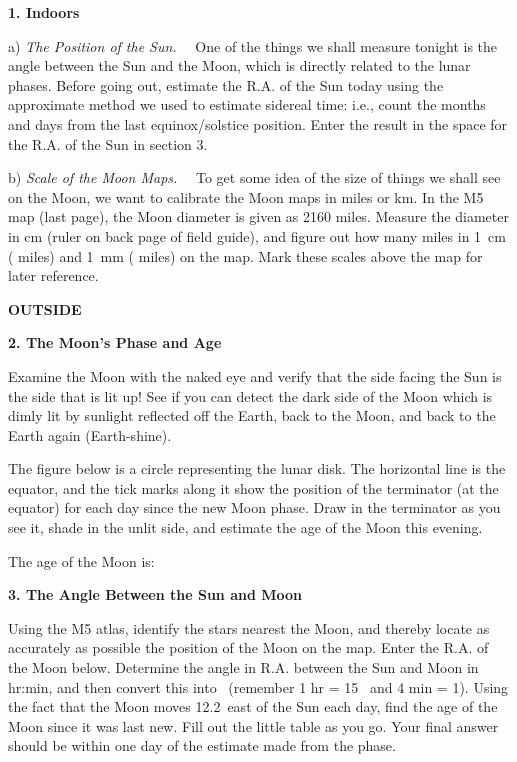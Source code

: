 
\bigskip
\noindent
{\bf 1. Indoors  }

\medskip\noindent 
a) \emph{The Position of the Sun.} \ \ 
One of the things we shall measure tonight is the angle between the Sun
and the Moon, which is directly related to the lunar phases. Before going
out, estimate the R.A. of the Sun today using the approximate
method we used to estimate sidereal time: i.e., count the months and
days from the last equinox/solstice position. Enter the result in the
space for the R.A. of the Sun in section 3.

\medskip\noindent 
b) \emph{Scale of the Moon Maps.} \ \
To get some idea of the size of things we shall see on the Moon, we want to
calibrate the Moon maps in miles or km. In the M5 map (last page), the
Moon diameter is given as 2160 miles. Measure the diameter in cm (ruler
on back page of field guide), and figure out how many miles in 1~cm
(\makebox[1.5cm]{\hrulefill} miles) and 1~mm (\makebox[1.5
cm]{\hrulefill} miles) on the map. Mark these scales above the map for
later reference. 

\bigskip
\noindent
{\bf OUTSIDE}

\bigskip
\noindent
{\bf 2. The Moon's Phase and Age}

\medskip\noindent 
Examine the Moon with the naked eye and verify that the side facing
the Sun is the side that is lit up! 
See if you can detect the dark side of the Moon
which is dimly lit by sunlight reflected off the Earth, back to the
Moon, and back to the Earth again (Earth-shine).

The figure below is a circle representing the lunar disk. The
horizontal line is the equator, and the tick marks along it show the
position of the terminator (at the equator) for each day since the new
Moon phase. Draw in the terminator as you see it, shade in the unlit
side, and estimate the age of the Moon this evening.
\medskip

{ \hfill The age of the Moon is: \makebox[2cm]{\hrulefill} }

\begin{figure*}[h]
        \centerline{}
        \caption{}
         \end{figure*}

\newpage

\bigskip
\noindent
{\bf 3. The Angle Between the Sun and Moon}

\medskip\noindent 
Using the M5 atlas, identify the stars nearest the Moon, and thereby locate as
accurately as possible the position of the Moon on the map.
Enter the R.A. of the Moon below. Determine the angle in R.A. between
the Sun and
Moon in hr:min, and then convert this into \deg\ (remember 1 hr = 15
\deg\, and 4 min = 1\deg). Using the fact that the Moon moves 12.2\deg\
east of the Sun each day, find the age of the Moon since it was last
new. Fill out the little table as you go. Your final answer should be
within one day of the estimate made from the phase.

